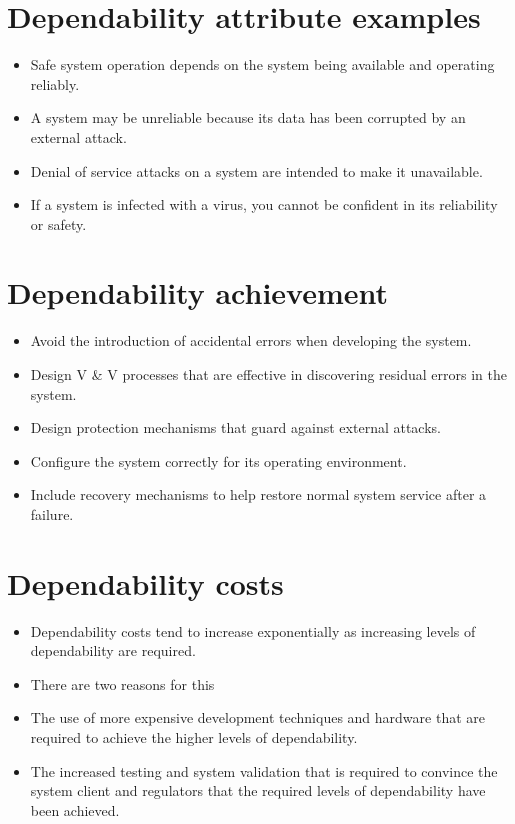 \section{Dependability attribute examples}
\begin{itemize}
\item Safe system operation depends on the system being available and operating reliably.

\item A system may be unreliable because its data has been corrupted by an external attack.

\item Denial of service attacks on a system are intended to make it unavailable.

\item If a system is infected with a virus, you cannot be confident in its reliability or safety.

\end{itemize}
\section{Dependability achievement}
\begin{itemize}
\item Avoid the introduction of accidental errors when developing the system.

\item Design V \& V processes that are effective in discovering residual errors in the system.

\item Design protection mechanisms that guard against external attacks.

\item Configure the system correctly for its operating environment.

\item Include recovery mechanisms to help restore normal system service after a failure.

\end{itemize}
\section{Dependability costs}
\begin{itemize}
\item Dependability costs tend to increase exponentially as increasing levels of dependability are required.

\item There are two reasons for this

  \item The use of more expensive development techniques and hardware that are required to achieve the higher levels of dependability.
  \item The increased testing and system validation that is required to convince the system client and regulators that the required levels of dependability have been achieved.

\end{itemize}
